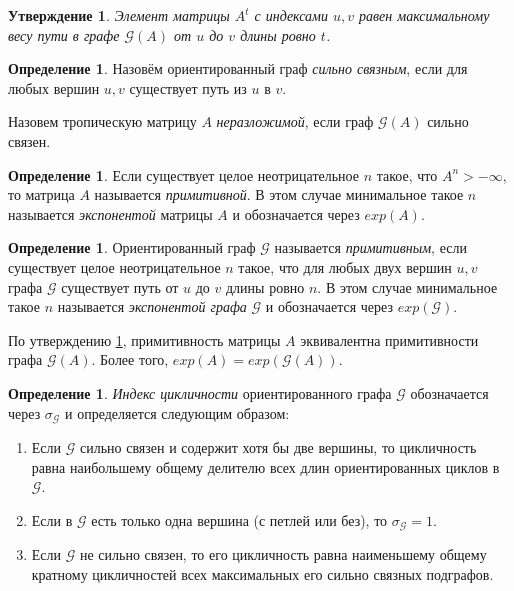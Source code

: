 \documentclass[12pt]{article}
\newtheorem{proposition}[theorem]{Утверждение}
\theoremstyle{definition}
\newtheorem{definition}[theorem]{Определение}
\begin{document}
\begin{proposition} \cite[равенство (9)]{bounds}
\label{entriesInPower}
Элемент матрицы $A^t$ с индексами $u, v$ равен максимальному весу пути в графе $\mathcal{G}(A)$ от $u$ до $v$ длины ровно $t$.
\end{proposition}

\begin{definition}
Назовём ориентированный граф \textit{сильно связным}, если для любых вершин $u, v$ существует путь из $u$ в $v$.

Назовем тропическую матрицу $A$ \textit{неразложимой}, если граф $\mathcal{G}(A)$ сильно связен.
\end{definition}

\begin{definition}
Если существует целое неотрицательное $n$ такое, что $A^n > -\infty$, то матрица $A$ называется \textit{примитивной}. В этом случае минимальное такое $n$ называется \textit{экспонентой} матрицы $A$ и обозначается через $exp(A)$.
\end{definition}

\begin{definition}
Ориентированный граф $\mathcal{G}$ называется \textit{примитивным}, если существует целое неотрицательное $n$ такое, что для любых двух вершин $u, v$ графа $\mathcal{G}$ существует путь от $u$ до $v$ длины ровно $n$. В этом случае минимальное такое $n$ называется \textit{экспонентой графа} $\mathcal{G}$ и обозначается через $exp(\mathcal{G})$.
\end{definition}

По утверждению \ref{entriesInPower}, примитивность матрицы $A$ эквивалентна примитивности графа $\mathcal{G}(A)$. Более того, $exp(A) = exp(\mathcal{G}(A))$.

\begin{definition} \cite[опр. 2.1]{cyclicity}
\textit{Индекс цикличности} ориентированного графа $\mathcal{G}$ обозначается через $\sigma_\mathcal{G}$ и определяется следующим образом:
\begin{enumerate}
    \item Если $\mathcal{G}$ сильно связен и содержит хотя бы две вершины, то цикличность равна наибольшему общему делителю всех длин ориентированных циклов в $\mathcal{G}$.
    \item Если в $\mathcal{G}$ есть только одна вершина (с петлей или без), то $\sigma_\mathcal{G} = 1$.
    \item Если $\mathcal{G}$ не сильно связен, то его цикличность равна наименьшему общему кратному цикличностей всех максимальных его сильно связных подграфов.
\end{enumerate}
\end{definition}
\end{document}
